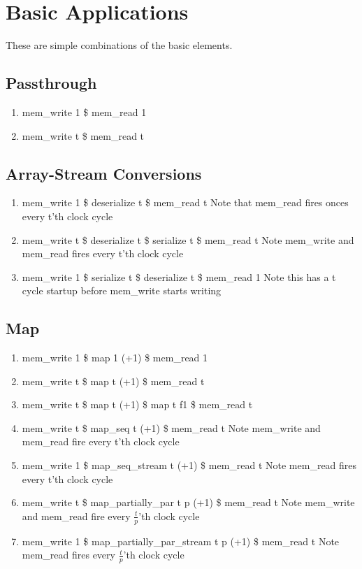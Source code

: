 \documentclass[11pt,fleqn]{article}
\numberwithin{equation}{subsection}
\begin{document}
\section{Basic Applications}
These are simple combinations of the basic elements.

\subsection{Passthrough}
\begin{enumerate}
    \item mem\_write 1 \$ mem\_read 1
    \item mem\_write t \$ mem\_read t 
\end{enumerate}

\subsection{Array-Stream Conversions}
\begin{enumerate}
    \item mem\_write 1 \$ deserialize t \$ mem\_read t
        \subitem Note that mem\_read fires onces every t'th clock cycle
    \item mem\_write t \$ deserialize t \$ serialize t \$ mem\_read t
        \subitem Note mem\_write and mem\_read fires every t'th clock cycle
    \item mem\_write 1 \$ serialize t \$ deserialize t \$ mem\_read 1
        \subitem Note this has a t cycle startup before mem\_write starts writing
\end{enumerate}

\subsection{Map}
\begin{enumerate}
    \item mem\_write 1 \$ map 1 (+1) \$ mem\_read 1
    \item mem\_write t \$ map t (+1) \$ mem\_read t
    \item mem\_write t \$ map t (+1) \$ map t f1 \$ mem\_read t
    \item mem\_write t \$ map\_seq t (+1) \$ mem\_read t
        \subitem Note mem\_write and mem\_read fire every t'th clock cycle
    \item mem\_write 1 \$ map\_seq\_stream t (+1) \$ mem\_read t
        \subitem Note mem\_read fires every t'th clock cycle
    \item mem\_write t \$ map\_partially\_par t p (+1) \$ mem\_read t
        \subitem Note mem\_write and mem\_read fire every $\frac{t}{p}$'th clock cycle
    \item mem\_write 1 \$ map\_partially\_par\_stream t p (+1) \$ mem\_read t
        \subitem Note mem\_read fires every $\frac{t}{p}$'th clock cycle
\end{enumerate}
\end{document}
